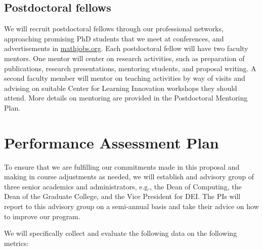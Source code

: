 \documentclass[11pt]{NSFamsart}
\begin{document}


\subsection*{Postdoctoral fellows}
We will recruit postdoctoral fellows through our professional networks, approaching promising PhD students that we meet at conferences, and advertisements in \url{mathjobs.org}. Each postdoctoral fellow will have two faculty mentors. One mentor will center on research activities, such as preparation of 
publications, research presentations, mentoring students, and proposal writing. A second faculty member will mentor on teaching activities by way of visits and advising on suitable Center for Learning Innovation workshops they should attend. More details on mentoring are provided in the Postdoctoral Mentoring Plan.





\section{Performance Assessment Plan  }
 
To ensure that we are fulfilling our commitments made in this proposal and making in course adjustments as needed, we will establish and advisory group of three senior academics and administrators, e.g., the Dean of Computing, the Dean of the Graduate College, and the Vice President for DEI.  The PIs will report to this advisory group on a semi-annual basis and take their advice on how to improve our program.

We will specifically collect and evaluate the following data on the following metrics:
\end{document}
